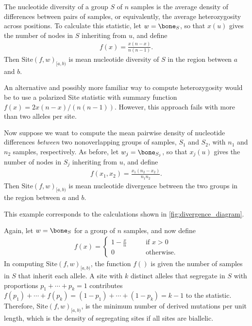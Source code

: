 \documentclass{article}
\newcommand{\site}{\mbox{Site}} %
\newcommand{\iw}{w} %
\newcommand{\nw}{x} %
\begin{document}
\begin{example} \label{ex:site_diversity}
    The nucleotide diversity of a group $S$ of $n$ samples
    is the average density of differences between pairs of samples,
    or equivalently, the average heterozygosity across positions.
    To calculate this statistic,
    let $\iw = \bone_S$,
    so that $\nw(u)$ gives the number of nodes in $S$ inheriting from $u$,
    and define
    \begin{align*}
        f(x) = \frac{x (n - x)}{n (n-1)} .
    \end{align*}
    Then $\site(f, \iw)_{[a,b)}$ is mean nucleotide diversity of $S$ in the region between $a$ and $b$.
\end{example}

An alternative and possibly more familiar way to compute heterozygosity
would be to use a polarized Site statistic with summary function $f(x) = 2
x(n-x)/\left(n(n-1)\right)$.
However, this approach fails with more than two alleles per site.

\begin{example} \label{ex:site_divergence}
    Now suppose we want to compute the mean pairwise density of nucleotide differences
    \emph{between} two nonoverlapping groups of samples, $S_1$ and $S_2$,
    with $n_1$ and $n_2$ samples, respectively.
    As before,
    let $\iw_j = \bone_{S_j}$,
    so that $\nw_{j}(u)$ gives the number of nodes in $S_j$ inheriting from $u$,
    and define
    \begin{align*}
        f(x_1, x_2) = \frac{x_1 (n_2 - x_2)}{n_1 n_2} .
    \end{align*}
    Then $\site(f, \iw)_{[a,b)}$ is mean nucleotide divergence between the two groups
    in the region between $a$ and $b$.
\end{example}

This example corresponds to the calculations shown in \autoref{fig:divergence_diagram}.

\begin{example} \label{ex:segregating_sites}
    Again, let $\iw = \bone_{S}$ for a group of $n$ samples,
    and now define
    \begin{align*}
        f(x) = \begin{cases}
            1 - \frac{x}{n} \qquad &\text{if } x > 0 \\
            0 \qquad &\text{otherwise} .
        \end{cases}
    \end{align*}
    In computing $\site(f, \iw)_{[a,b)}$, the function $f()$ is given the number of samples in $S$
    that inherit each allele.
    A site with $k$ distinct alleles that segregate in $S$ with proportions $p_1 + \cdots + p_k = 1$
    contributes $f(p_1) + \cdots + f(p_k) = (1 - p_1) + \cdots + (1 - p_k) = k - 1$ to the statistic.
    Therefore, $\site(f, \iw)_{[a,b)}$, is the minimum number of derived mutations per unit length,
    which is the density of segregating sites if all sites are biallelic.
\end{example}
\end{document}
